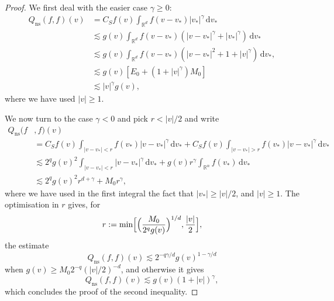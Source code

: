 \documentclass[11pt]{article}
\newcommand{\ns}{\mathrm{ns}}
\theoremstyle{plain}
\theoremstyle{definition}
\numberwithin{equation}{section}
\newcommand{\R}{\mathbb R}
\newcommand{\dd} {\, \mathrm{d}}
\begin{document}
\begin{proof}
We first deal with the easier case $\gamma \ge 0$:
\begin{align*}
Q_{\ns}(f,f)(v) & = C_S f(v) \int_{\R^d} f(v-v_*) |v_*|^\gamma \dd v_* \\
& \lesssim g(v) \int_{\R^d} f(v-v_*) \left(|v-v_*|^\gamma+ |v_*|^{\gamma}\right) \dd v_* \\
& \lesssim g(v) \int_{\R^d} f(v-v_*) \left(|v-v_*|^2+1 + |v|^{\gamma}\right) \dd v_*, \\
& \lesssim g(v) \left[ E_0 + \left(1+|v|^\gamma\right) M_0 \right] \\
& \lesssim |v|^\gamma g(v),
\end{align*}
where we have used $|v| \ge 1$.

We now turn to the case $\gamma <0$ and pick $r < |v|/2$ and write
\begin{align*}
Q_{\ns}(f&,f)(v) \\
& = C_S f(v) \int_{|v-v_*|< r} f(v_*) |v-v_*|^\gamma
\dd v_* + C_S f(v) \int_{|v-v_*| > r} f(v_*) |v-v_*|^\gamma \dd v_* \\
& \lesssim 2^ q g(v)^2 \int_{|v-v_*|< r} |v-v_*|^\gamma \dd v_*
+ g(v) r^{\gamma} \int_{\R^n} f(v_*) \dd v_* \\
& \lesssim 2^q g(v)^2 r^{d+\gamma} + M_0 r^{\gamma},
\end{align*}
where we have used in the first integral the fact that $|v_*| \ge
|v|/2$, and $|v| \ge 1$. The optimisation in $r$ gives, for
\[
r := \min \Bigl[ \Bigl(\frac{M_0}{2^q g(v)}\Bigl)^{1/d},
\frac{|v|}{2} \Bigl],
\]
the estimate
\begin{equation*}
Q_{\ns}(f,f)(v) \lesssim 2^{-q\gamma/d} g(v)^{1-\gamma/d}
\end{equation*}
when $g(v) \ge M_0 2^{-q} (|v|/2)^{-d}$, and otherwise it gives
\begin{equation*}
Q_{\ns}(f,f)(v) \lesssim g(v) (1+|v|)^\gamma,
\end{equation*}
which concludes the proof of the second inequality.


\end{proof}
\end{document}
